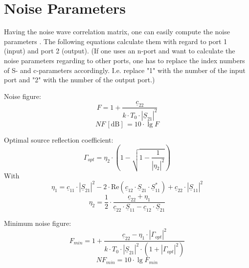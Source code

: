\documentclass[10pt]{report}
\begin{document}
\section{Noise Parameters}

Having the noise wave correlation matrix, one can easily compute the
noise parameters \cite{Wedge}.  The following equations calculate them with regard
to port 1 (input) and port 2 (output). (If one uses an n-port and want to calculate
the noise parameters regarding to other ports, one has to replace the index numbers
of S- and c-parameters accordingly. I.e. replace "1" with the number of the input
port and "2" with the number of the output port.)

\addvspace{12pt}

Noise figure:
\begin{equation}
F = 1 + \frac{\underline{c}_{22}}{k\cdot T_0\cdot |\underline{S}_{21}|^2}
\label{eqn:nparamF}
\end{equation}
\begin{equation}
NF\,[\text{dB}]\, = 10\cdot\lg F
\end{equation}

\addvspace{12pt}

Optimal source reflection coefficient:
\begin{equation}
\Gamma_{opt} = \eta_2\cdot\left( 1-\sqrt{1-\frac{1}{|\eta_2|^2}} \right)
\end{equation}
With
\begin{equation}
\eta_1 = \underline{c}_{11}\cdot |\underline{S}_{21}|^2
       - 2\cdot \text{Re}(\underline{c}_{12}\cdot\underline{S}_{21}\cdot\underline{S}_{11}^*)
       + \underline{c}_{22}\cdot|\underline{S}_{11}|^2
\end{equation}
\begin{equation}
\eta_2 = \frac{1}{2}\cdot\frac{\underline{c}_{22} + \eta_1}
              {\underline{c}_{22}\cdot\underline{S}_{11} - \underline{c}_{12}\cdot\underline{S}_{21}}
\end{equation}

\addvspace{12pt}

Minimum noise figure:
\begin{equation}
F_{min} = 1 + \frac{\underline{c}_{22} - \eta_1\cdot |\Gamma_{opt}|^2}
                   {k\cdot T_0\cdot |\underline{S}_{21}|^2\cdot (1+|\Gamma_{opt}|^2)}
\end{equation}
\begin{equation}
NF_{min} = 10\cdot \lg F_{min}
\end{equation}
\end{document}
